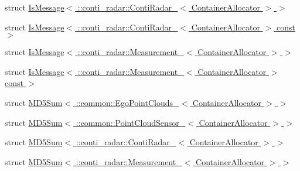 \begin{DoxyCompactItemize}
\item 
struct \hyperlink{structros_1_1message__traits_1_1IsMessage_3_01_1_1conti__radar_1_1ContiRadar___3_01ContainerAllocator_01_4_01_4}{Is\+Message$<$ \+::conti\+\_\+radar\+::\+Conti\+Radar\+\_\+$<$ Container\+Allocator $>$ $>$}
\item 
struct \hyperlink{structros_1_1message__traits_1_1IsMessage_3_01_1_1conti__radar_1_1ContiRadar___3_01ContainerAllocator_01_4_01const_01_4}{Is\+Message$<$ \+::conti\+\_\+radar\+::\+Conti\+Radar\+\_\+$<$ Container\+Allocator $>$ const $>$}
\item 
struct \hyperlink{structros_1_1message__traits_1_1IsMessage_3_01_1_1conti__radar_1_1Measurement___3_01ContainerAllocator_01_4_01_4}{Is\+Message$<$ \+::conti\+\_\+radar\+::\+Measurement\+\_\+$<$ Container\+Allocator $>$ $>$}
\item 
struct \hyperlink{structros_1_1message__traits_1_1IsMessage_3_01_1_1conti__radar_1_1Measurement___3_01ContainerAllocator_01_4_01const_01_4}{Is\+Message$<$ \+::conti\+\_\+radar\+::\+Measurement\+\_\+$<$ Container\+Allocator $>$ const $>$}
\item 
struct \hyperlink{structros_1_1message__traits_1_1MD5Sum_3_01_1_1common_1_1EgoPointClouds___3_01ContainerAllocator_01_4_01_4}{M\+D5\+Sum$<$ \+::common\+::\+Ego\+Point\+Clouds\+\_\+$<$ Container\+Allocator $>$ $>$}
\item 
struct \hyperlink{structros_1_1message__traits_1_1MD5Sum_3_01_1_1common_1_1PointCloudSensor___3_01ContainerAllocator_01_4_01_4}{M\+D5\+Sum$<$ \+::common\+::\+Point\+Cloud\+Sensor\+\_\+$<$ Container\+Allocator $>$ $>$}
\item 
struct \hyperlink{structros_1_1message__traits_1_1MD5Sum_3_01_1_1conti__radar_1_1ContiRadar___3_01ContainerAllocator_01_4_01_4}{M\+D5\+Sum$<$ \+::conti\+\_\+radar\+::\+Conti\+Radar\+\_\+$<$ Container\+Allocator $>$ $>$}
\item 
struct \hyperlink{structros_1_1message__traits_1_1MD5Sum_3_01_1_1conti__radar_1_1Measurement___3_01ContainerAllocator_01_4_01_4}{M\+D5\+Sum$<$ \+::conti\+\_\+radar\+::\+Measurement\+\_\+$<$ Container\+Allocator $>$ $>$}
\end{DoxyCompactItemize}
